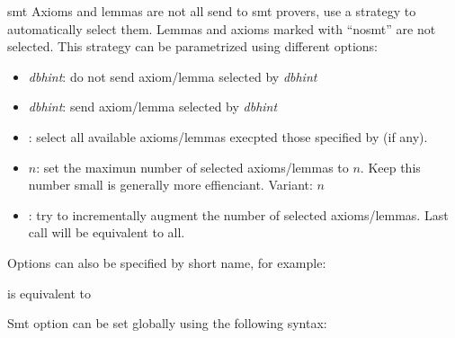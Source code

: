 \begin{tactic}{smt}
  Axioms and lemmas are not all send to smt provers, 
  \EasyCrypt use a strategy to automatically select them.
  Lemmas and axioms marked with ``nosmt'' are not selected.
  This strategy can be parametrized using different options:
  \begin{itemize}    
    \item {}\textit{dbhint}: 
          do not send axiom/lemma selected by \textit{dbhint}
    \item {}\textit{dbhint}: 
          send axiom/lemma selected by \textit{dbhint} 
    \item {}: 
          select all available axioms/lemmas execpted those specified by 
           (if any).
    \item {}$n$: 
          set the maximun number of selected axioms/lemmas to $n$.
          Keep this number small is generally more effienciant.
          Variant: $n$
    \item {}: try to incrementally augment the number of selected
          axioms/lemmas. Last call will be equivalent to all.
  \end{itemize}


  Options can also be specified by short name, for example:
  \begin{center} \end{center}
  is equivalent to 
  \begin{center}
  \end{center}

  Smt option can be set globally using the following syntax:\\
   


\end{tactic}
